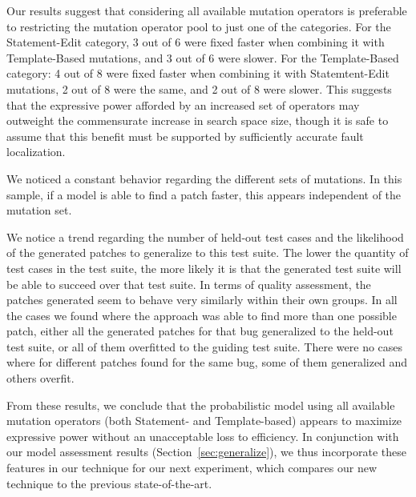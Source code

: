 \documentclass[conference]{IEEEtran}
\begin{document}
Our results suggest that considering all available mutation operators is
preferable to 
restricting the mutation operator pool to just one of the categories. For the
Statement-Edit category, 3 out of 6 were fixed faster when combining it with
Template-Based mutations, and 3 out of 6 were slower. For the Template-Based
category: 4 out of 8 were fixed faster when combining it with Statemtent-Edit
mutations, 2 out of 8 were the same, and 2 out of 8 were slower. This suggests
that the expressive power afforded by an increased set of operators may
outweight the commensurate increase in search space size, though it is safe to
assume that this benefit must be supported by sufficiently accurate fault
localization. 

We noticed a
constant behavior regarding the different sets of mutations. In this sample, if
a model is able to find a patch faster, this appears independent of the mutation
set. 

We notice a trend regarding the number of held-out test cases and the likelihood of the generated patches to generalize to this test suite. The lower the quantity of test cases in the test suite, the more likely it is that the generated test suite will be able to succeed over that test suite. In terms of quality assessment, the patches generated seem to behave very similarly within their own groups. In all the cases we found where the approach was able to find more than one possible patch, either all the generated patches for that bug generalized to the held-out test suite, or all of them overfitted to the guiding test suite. There were no cases where for different patches found for the same bug, some of them generalized and others overfit.

From these results, we conclude that the probabilistic model using all available
mutation operators (both Statement- and Template-based) appears to maximize
expressive power without an unacceptable loss to efficiency.  In conjunction
with our model assessment results (Section~\ref{sec:generalize}), we thus
incorporate these features in our technique for our next experiment, which
compares our new technique to the previous state-of-the-art.

\end{document}
